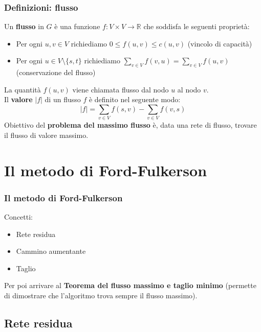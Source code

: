 \documentclass{beamer}
\begin{document}
\begin{frame}
\frametitle{Definizioni: flusso}
Un \textbf{flusso} in $G$ è una funzione $f:V\times V\rightarrow \mathbb{R}$ che soddisfa le seguenti proprietà:
\begin{itemize}
\item Per ogni $u,v\in V$ richiediamo $0\leq f(u,v)\leq c(u,v)$ (vincolo di capacità)
\item Per ogni $u\in V\setminus\{s,t\}$ richiediamo $\sum\limits_{v\in V}f(v,u)=\sum\limits_{v\in V}f(u,v)$ (conservazione del flusso)
\end{itemize}
La quantità $f(u,v)$ viene chiamata flusso dal nodo $u$ al nodo $v$.\\
Il \textbf{valore} $|f|$ di un flusso $f$ è definito nel seguente modo:\\
$$|f|=\sum\limits_{v\in V}f(s,v)-\sum\limits_{v\in V}f(v,s)$$
Obiettivo del \textbf{problema del massimo flusso} è, data una rete di flusso, trovare il flusso di valore massimo.
\end{frame}

\section{Il metodo di Ford-Fulkerson}

\begin{frame}
\frametitle{Il metodo di Ford-Fulkerson}
Concetti:
\begin{itemize}
\item Rete residua
\item Cammino aumentante
\item Taglio
\end{itemize}
Per poi arrivare al \textbf{Teorema del flusso massimo e taglio minimo} (permette di dimostrare che l'algoritmo trova sempre il flusso massimo).
\end{frame}

\subsection{Rete residua}
\end{document}

